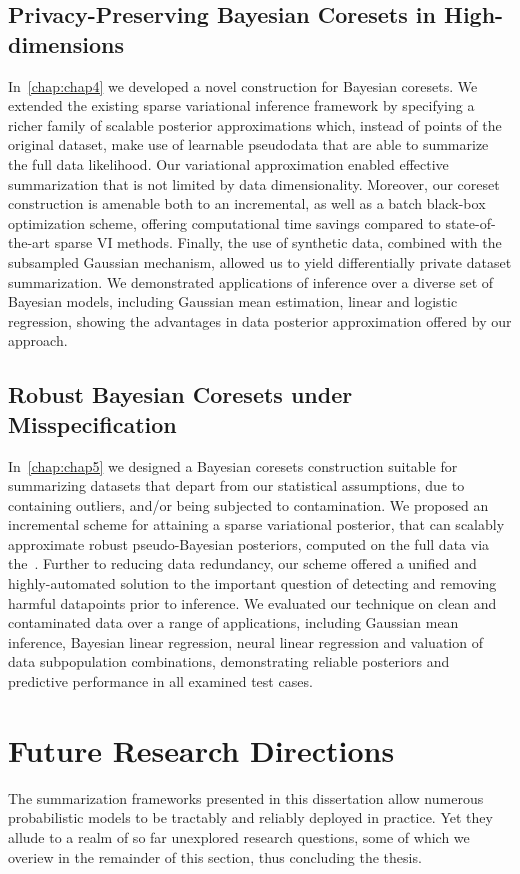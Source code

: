 \subsection{Privacy-Preserving Bayesian Coresets in High-dimensions}
\label{subsec:ch4-summary}
In~\cref{chap:chap4} we developed a novel construction for Bayesian coresets. We extended the existing sparse variational inference framework by specifying a richer family of scalable posterior approximations which, instead of points of the original dataset, make use of learnable pseudodata that are able to summarize the full data likelihood. Our variational approximation enabled effective summarization that is not limited by data dimensionality. Moreover, our coreset construction is amenable both to an incremental, as well as a batch black-box optimization scheme, offering computational time savings compared to state-of-the-art sparse VI methods. Finally, the use of synthetic data, combined with the subsampled Gaussian mechanism, allowed us to yield differentially private dataset summarization. We demonstrated applications of inference over a diverse set of Bayesian models, including Gaussian mean estimation, linear and logistic regression, showing the advantages in data posterior approximation offered by our approach.

\subsection{Robust Bayesian Coresets under Misspecification}
\label{subsec:ch4-summary}
In~\cref{chap:chap5} we designed a Bayesian coresets construction suitable for summarizing datasets that depart from our statistical assumptions, due to containing outliers, and/or being subjected to contamination. We proposed an incremental scheme for attaining a sparse variational posterior, that can scalably approximate robust pseudo-Bayesian posteriors, computed on the full data via the~\bdiv. Further to reducing data redundancy, our scheme offered a unified and highly-automated solution to the important question of detecting and removing harmful datapoints prior to inference. We evaluated our technique on clean and contaminated data over a range of applications, including Gaussian mean inference, Bayesian linear regression, neural linear regression and valuation of data subpopulation combinations, demonstrating reliable posteriors and predictive performance in all examined test cases.


\section{Future Research Directions}
\label{sec:future-research-directions}
The summarization frameworks presented in this dissertation allow numerous probabilistic models to be tractably and reliably deployed in practice. Yet they allude to a realm of so far unexplored research questions, some of which we overiew in the remainder of this section, thus concluding the thesis.

